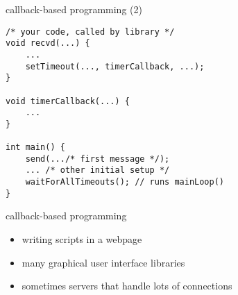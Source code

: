 \begin{frame}[fragile]{callback-based programming (2)}
\begin{Verbatim}[fontsize=\small]
/* your code, called by library */
void recvd(...) {
    ...
    setTimeout(..., timerCallback, ...);
}

void timerCallback(...) {
    ...
}

int main() {
    send(.../* first message */);
    ... /* other initial setup */
    waitForAllTimeouts(); // runs mainLoop()
}
\end{Verbatim}
\end{frame}


\begin{frame}{callback-based programming}
    \begin{itemize}
    \item writing scripts in a webpage
    \item many graphical user interface libraries
    \item sometimes servers that handle lots of connections
    \end{itemize}
\end{frame}
